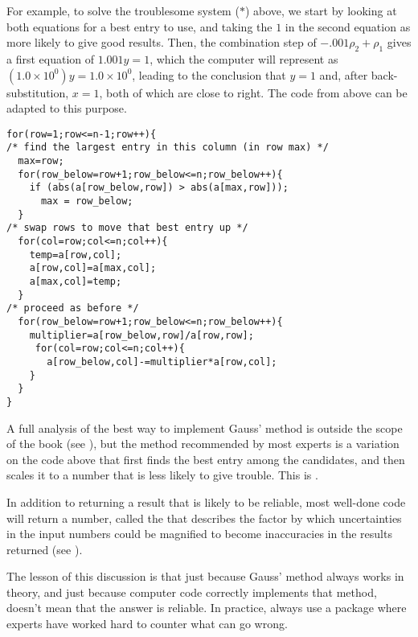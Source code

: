 For example, to solve the troublesome system ($*$) above,
we start by looking at both equations for a best entry to use, 
and taking the $1$ in
the second equation as more likely to give good results.
Then, the combination step of $-.001\rho_2+\rho_1$ gives a first equation of 
$1.001y=1$, which the computer will represent as 
$(1.0\times 10^{0})y=1.0\times 10^{0}$, leading to the conclusion that 
$y=1$ and, after back-substitution, $x=1$, 
both of which are close to right.  
The code from above can be adapted to this purpose.
\begin{indented}
\small
\begin{verbatim}
for(row=1;row<=n-1;row++){
/* find the largest entry in this column (in row max) */
  max=row;
  for(row_below=row+1;row_below<=n;row_below++){
    if (abs(a[row_below,row]) > abs(a[max,row]));
      max = row_below;
  }
/* swap rows to move that best entry up */
  for(col=row;col<=n;col++){
    temp=a[row,col];
    a[row,col]=a[max,col];
    a[max,col]=temp;
  }
/* proceed as before */
  for(row_below=row+1;row_below<=n;row_below++){
    multiplier=a[row_below,row]/a[row,row];
     for(col=row;col<=n;col++){
       a[row_below,col]-=multiplier*a[row,col];
    }
  }
}
\end{verbatim}
\end{indented}

A full analysis of the best way to implement Gauss' method 
is outside the scope of the book (see \cite{Wilkinson65}),
but the method recommended by most experts 
is a variation on the code above that first finds the best entry
among the candidates, and then scales it to a number that is less
likely to give trouble.
This is 
.

In addition to returning a result that is likely to be reliable,
most well-done code will return a number, called the 
%
that describes the factor by which uncertainties in the input numbers
could be magnified to become inaccuracies in the results returned 
(see \cite{Rice}).

The lesson of this discussion is that
just because Gauss' method always works in theory, and just
because computer code correctly implements that method,
doesn't mean that the answer is reliable.
In practice, always use a package
where experts have worked hard to counter what can go wrong.

